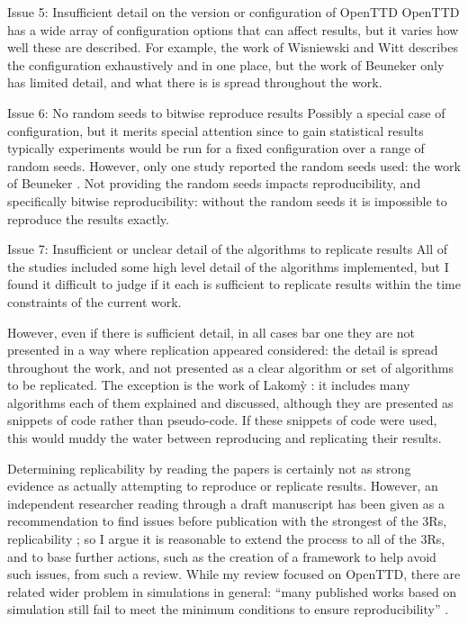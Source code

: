 \documentclass[logo,msc,dsti]{style/infthesis}    %
\begin{document}
{\begin{itemize}
\begin{descitem}{Issue 5: Insufficient detail on the version or configuration of OpenTTD}
OpenTTD has a wide array of configuration options that can affect results, but it varies how well these are described. For example, the work of Wisniewski and Witt \cite{wisniewski2011artificial} describes the configuration exhaustively and in one place, but the work of Beuneker \cite{bijlsma2014evolving} only has limited detail, and what there is is spread throughout the work.
\end{descitem}
\begin{descitem}{Issue 6: No random seeds to bitwise reproduce results}
Possibly a special case of configuration, but it merits special attention since to gain statistical results typically experiments would be run for a fixed configuration over a range of random seeds. However, only one study reported the random seeds used: the work of Beuneker \cite{beuneker2019autonomous}. Not providing the random seeds impacts reproducibility, and specifically bitwise reproducibility: without the random seeds it is impossible to reproduce the results exactly.
\end{descitem}

\begin{descitem}{Issue 7: Insufficient or unclear detail of the algorithms to replicate results}
All of the studies included some high level detail of the algorithms implemented, but I found it difficult to judge if it each is sufficient to replicate results within the time constraints of the current work.

However, even if there is sufficient detail, in all cases bar one they are not presented in a way where replication appeared considered: the detail is spread throughout the work, and not presented as a clear algorithm or set of algorithms to be replicated. The exception is the work of {Lakom{\`y}} \cite{lakomy2020railroad}: it includes many algorithms each of them explained and discussed, although they are presented as snippets of code rather than pseudo-code. If these snippets of code were used, this would muddy the water between reproducing and replicating their results.
\end{descitem}

\end{itemize}
%
Determining replicability by reading the papers is certainly not as strong evidence as actually attempting to reproduce or replicate results. However, an independent researcher reading through a draft manuscript has been given as a recommendation to find issues before publication with the strongest of the 3Rs, replicability \cite{luijken2024replicability}; so I argue it is reasonable to extend the process to all of the 3Rs, and to base further actions, such as the creation of a framework to help avoid such issues, from such a review. While my review focused on OpenTTD, there are related wider problem in simulations in general: ``many published works based on simulation still fail to meet the minimum conditions to ensure reproducibility'' \cite{dalle2012reproducibility}.

}
\end{document}
